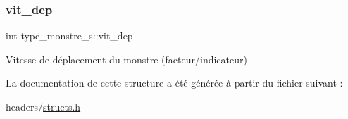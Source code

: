 \subsubsection{\texorpdfstring{vit\+\_\+dep}{vit\_dep}}
{\footnotesize\ttfamily int type\+\_\+monstre\+\_\+s\+::vit\+\_\+dep}

Vitesse de déplacement du monstre (facteur/indicateur) 

La documentation de cette structure a été générée à partir du fichier suivant \+:\begin{DoxyCompactItemize}
\item 
headers/\hyperlink{structs_8h}{structs.\+h}\end{DoxyCompactItemize}
